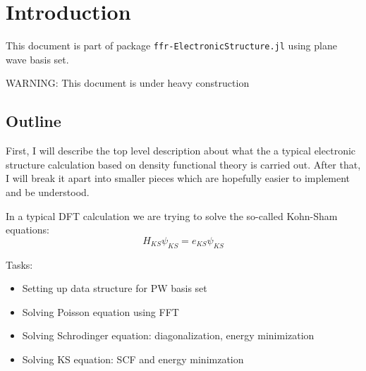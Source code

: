\chapter{Introduction}

This document is part of package
{\tt ffr-ElectronicStructure.jl} using plane wave basis set.

{\color{red} WARNING: This document is under heavy construction}

\section{Outline}

First, I will describe the top level description about what
the a typical electronic structure calculation based on density functional
theory is carried out. After that, I will break it apart into
smaller pieces which are hopefully easier to implement and be understood.

In a typical DFT calculation we are trying to solve the so-called Kohn-Sham
equations:
\begin{equation}
H_{KS} \psi_{KS} = e_{KS} \psi_{KS}
\end{equation}

Tasks:
\begin{itemize}
\item Setting up data structure for PW basis set
\item Solving Poisson equation using FFT
\item Solving Schrodinger equation: diagonalization, energy minimization
\item Solving KS equation: SCF and energy minimzation
\end{itemize}
